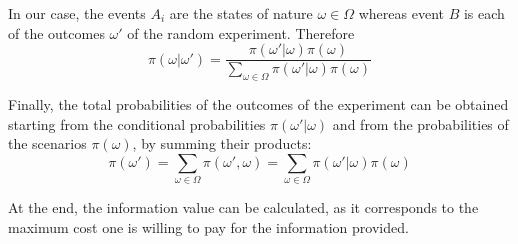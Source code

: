 In our case, the events $A_i$ are the states of nature $\omega \in \Omega$ whereas event $B$ is each of the outcomes $\omega'$ of the random experiment. Therefore
$$ \pi(\omega | \omega') = \frac{\pi(\omega' | \omega) \pi(\omega)}{\sum_{\omega \in \Omega} \pi(\omega' | \omega) \pi (\omega)}$$

Finally, the total probabilities of the outcomes of the experiment can be obtained starting from the conditional probabilities $\pi (\omega' | \omega)$ and from the probabilities of the scenarios $\pi (\omega)$, by summing their products:
$$ \pi(\omega') = \sum_{\omega \in \Omega} \pi(\omega', \omega) = \sum_{\omega \in \Omega} \pi(\omega' | \omega) \pi (\omega) $$

At the end, the information value can be calculated, as it corresponds to the maximum cost one is willing to pay for the information provided.

